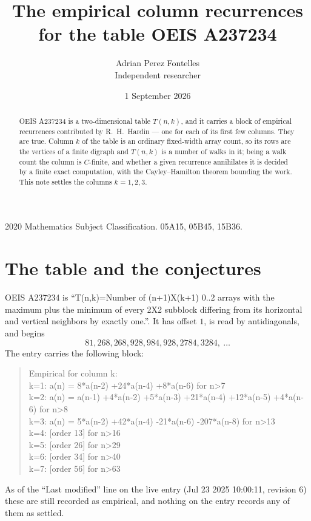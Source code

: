 \documentclass[11pt,a4paper]{article}
\title{The empirical column recurrences for the table OEIS A237234}
\author{Adrian Perez Fontelles\\ \small Independent researcher}
\date{1 September 2026}
\theoremstyle{plain}
\theoremstyle{definition}
\begin{document}
\maketitle

\begin{abstract}
OEIS A237234 is a two-dimensional table $T(n,k)$, and it carries a block of empirical
recurrences contributed by R.~H.~Hardin --- one for each of its first few columns. They are
true. Column $k$ of the table is an ordinary fixed-width array count, so its rows are the
vertices of a finite digraph and $T(n,k)$ is a number of walks in it; being a walk count the
column is $C$-finite, and whether a given recurrence annihilates it is decided by a finite
exact computation, with the Cayley--Hamilton theorem bounding the work. This note settles the columns $k=1, 2, 3$.
\end{abstract}

\noindent\small 2020 Mathematics Subject Classification. 05A15, 05B45, 15B36.\normalsize

\section{The table and the conjectures}

OEIS A237234 is ``T(n,k)=Number of (n+1)X(k+1) 0..2 arrays with the maximum plus the minimum of every 2X2 subblock differing from its horizontal and vertical neighbors by exactly one.''. It has offset $1$, is
read by antidiagonals, and begins
\[
81, 268, 268, 928, 984, 928, 2784, 3284,\ \dots
\]
The entry carries the following block:
\begin{quote}\small
Empirical for column k:\\
k=1: a(n) = 8*a(n-2) +24*a(n-4) +8*a(n-6) for n>7\\
k=2: a(n) = a(n-1) +4*a(n-2) +5*a(n-3) +21*a(n-4) +12*a(n-5) +4*a(n-6) for n>8\\
k=3: a(n) = 5*a(n-2) +42*a(n-4) -21*a(n-6) -207*a(n-8) for n>13\\
k=4: [order 13] for n>16\\
k=5: [order 26] for n>29\\
k=6: [order 34] for n>40\\
k=7: [order 56] for n>63\\
\end{quote}
As of the ``Last modified'' line on the live entry (Jul 23 2025 10:00:11, revision 6) these are still
recorded as empirical, and nothing on the entry records any of them as settled.
\end{document}
